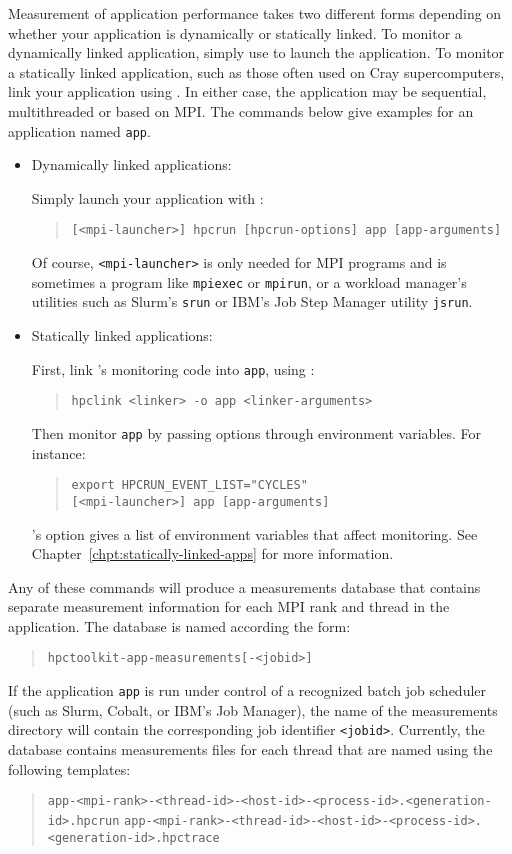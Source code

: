 \documentclass[11pt,letterpaper]{report}
\begin{document}
Measurement of application performance takes two different forms depending on whether your application is dynamically or statically linked.
To monitor a dynamically linked application, simply use \hpcrun{} to launch the application.
To monitor a statically linked application, such as those often used on  Cray supercomputers, link your application using \hpclink{}.
In either case, the application may be sequential, multithreaded or based on MPI.
The commands below give examples for an application named \texttt{app}.
%
\begin{itemize}

\item Dynamically linked applications:\hfill

Simply launch your application with \hpcrun{}:
\begin{quote}
  \verb|[<mpi-launcher>] hpcrun [hpcrun-options] app [app-arguments]|
\end{quote}
Of course, \texttt{<mpi-launcher>} is only needed for MPI programs and is sometimes a program like \texttt{mpiexec} or \texttt{mpirun}, or a workload manager's utilities such as Slurm's {\tt srun} or IBM's Job Step Manager utility {\tt jsrun}.

\item Statically linked applications:\hfill

First, link \hpcrun{}'s monitoring code into \texttt{app}, using \hpclink{}:
\begin{quote}
  \verb|hpclink <linker> -o app <linker-arguments>|
\end{quote}

Then monitor \texttt{app} by passing \hpcrun{} options through environment variables.
For instance:
\begin{quote}
\begin{verbatim}
export HPCRUN_EVENT_LIST="CYCLES"
[<mpi-launcher>] app [app-arguments]
\end{verbatim}
\end{quote}
\hpclink{}'s  option gives a list of environment variables that affect monitoring.
See Chapter~\ref{chpt:statically-linked-apps} for more information.

\end{itemize}
%
Any of these commands will produce a measurements database that contains separate measurement information for each MPI rank and thread in the application.
The database is named according the form:
\begin{quote}
  \verb|hpctoolkit-app-measurements[-<jobid>]|
\end{quote}
If the application \texttt{app} is run under control of a recognized batch job scheduler (such as Slurm, Cobalt, or IBM's Job Manager), the name of the measurements directory will contain the corresponding job identifier \texttt{<jobid>}.
Currently, the database contains measurements files for each thread that are named using the following templates:
\begin{quote}
  \verb|app-<mpi-rank>-<thread-id>-<host-id>-<process-id>.<generation-id>.hpcrun|
    \verb|app-<mpi-rank>-<thread-id>-<host-id>-<process-id>.<generation-id>.hpctrace|
\end{quote}
\end{document}
